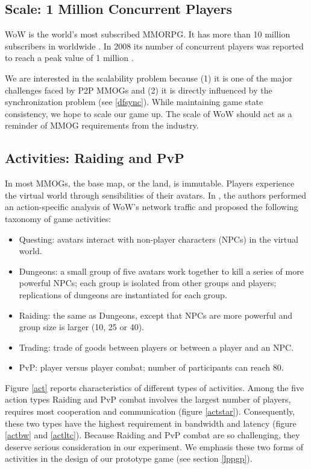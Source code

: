 \documentclass{article}
\begin{document}
\subsection{Scale: 1 Million Concurrent Players}
WoW is the world's most subscribed MMORPG. It has more than 10 million subscribers in worldwide \cite{wow12, Schiano11}. In 2008 its number of concurrent players was reported to reach a peak value of 1 million \cite{wow08}. 

We are interested in the scalability problem because (1) it is one of the major challenges faced by P2P MMOGs and (2) it is directly influenced by the synchronization problem (see \ref{dfsync}). While maintaining game state consistency, we hope to scale our game up. The scale of WoW should act as a reminder of MMOG requirements from the industry.

\subsection{Activities: Raiding and PvP}
\label{sec:act}
In most MMOGs, the base map, or the land, is immutable. Players experience the virtual world through sensibilities of their avatars. In \cite{Suznjevic08, Suznjevic09}, the authors performed an action-specific analysis of WoW's network traffic and proposed the following taxonomy of game activities:
\begin{itemize}
\item Questing: avatars interact with non-player characters (NPCs) in the virtual world.
\item Dungeons: a small group of five avatars work together to kill a series of more powerful NPCs; each group is isolated from other groups and players; replications of dungeons are instantiated for each group.
\item Raiding: the same as Dungeons, except that NPCs are more powerful and group size is larger (10, 25 or 40).
\item Trading: trade of goods between players or between a player and an NPC.
\item PvP: player versus player combat; number of participants can reach 80.
\end{itemize}
Figure \ref{act} reports characteristics of different types of activities. Among the five action types Raiding and PvP combat involves the largest number of players, requires most cooperation and communication (figure \ref{actstar}). Consequently, these two types have the highest requirement in bandwidth and latency (figure \ref{actbw} and \ref{actltc}). Because Raiding and PvP combat are so challenging, they deserve serious consideration in our experiment. We emphasis these two forms of activities in the design of our prototype game (see section \ref{lppgp}).
\end{document}
